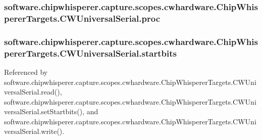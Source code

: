 \subsubsection[{proc}]{\setlength{\rightskip}{0pt plus 5cm}software.\+chipwhisperer.\+capture.\+scopes.\+cwhardware.\+Chip\+Whisperer\+Targets.\+C\+W\+Universal\+Serial.\+proc}\label{classsoftware_1_1chipwhisperer_1_1capture_1_1scopes_1_1cwhardware_1_1ChipWhispererTargets_1_1CWUniversalSerial_ac27901c152c25cca81f62bc1b8cca74f}
\hypertarget{classsoftware_1_1chipwhisperer_1_1capture_1_1scopes_1_1cwhardware_1_1ChipWhispererTargets_1_1CWUniversalSerial_ab133d939b71dfdafab12badc82ea69b6}{}
\subsubsection[{startbits}]{\setlength{\rightskip}{0pt plus 5cm}software.\+chipwhisperer.\+capture.\+scopes.\+cwhardware.\+Chip\+Whisperer\+Targets.\+C\+W\+Universal\+Serial.\+startbits}\label{classsoftware_1_1chipwhisperer_1_1capture_1_1scopes_1_1cwhardware_1_1ChipWhispererTargets_1_1CWUniversalSerial_ab133d939b71dfdafab12badc82ea69b6}


Referenced by software.\+chipwhisperer.\+capture.\+scopes.\+cwhardware.\+Chip\+Whisperer\+Targets.\+C\+W\+Universal\+Serial.\+read(), software.\+chipwhisperer.\+capture.\+scopes.\+cwhardware.\+Chip\+Whisperer\+Targets.\+C\+W\+Universal\+Serial.\+set\+Startbits(), and software.\+chipwhisperer.\+capture.\+scopes.\+cwhardware.\+Chip\+Whisperer\+Targets.\+C\+W\+Universal\+Serial.\+write().

\hypertarget{classsoftware_1_1chipwhisperer_1_1capture_1_1scopes_1_1cwhardware_1_1ChipWhispererTargets_1_1CWUniversalSerial_afe319dd6e0c353089c9d91278570ffa9}{}
